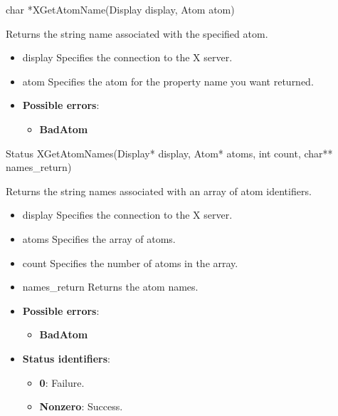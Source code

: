 \documentclass{report}
\begin{document}
\begin{itemize}
            \begin{cppcode}
            char *XGetAtomName(Display display, Atom atom)
            \end{cppcode}
            \bigbreak \noindent
            Returns the string name associated with the specified atom.

            \begin{itemize}
                \item display Specifies the connection to the X server.
                \item atom Specifies the atom for the property name you want returned.
            \end{itemize}

            \begin{itemize}
                \item \textbf{Possible errors}:
                    \begin{itemize}
                        \item \textbf{BadAtom}
                    \end{itemize}
            \end{itemize}

            \begin{cppcode}
            Status XGetAtomNames(Display* display, Atom* atoms, int count, char** names_return)
            \end{cppcode}
            \bigbreak \noindent
            Returns the string names associated with an array of atom identifiers.

            \begin{itemize}
                \item display Specifies the connection to the X server.
                \item atoms Specifies the array of atoms.
                \item count Specifies the number of atoms in the array.
                \item names\_return Returns the atom names.
            \end{itemize}

            \begin{itemize}
                \item \textbf{Possible errors}:
                    \begin{itemize}
                        \item \textbf{BadAtom}
                    \end{itemize}
                \item \textbf{Status identifiers}:
                    \begin{itemize}
                        \item \textbf{0}: Failure.
                        \item \textbf{Nonzero}: Success.
                    \end{itemize}
            \end{itemize}


\end{itemize}
\end{document}
